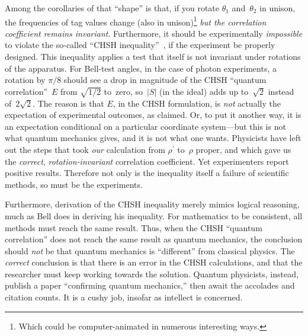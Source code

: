 \documentclass[9pt,technote]{IEEEtran}
\begin{document}
Among the corollaries of that ``shape'' is that, if you rotate
$\theta_1$ and~$\theta_2$ in unison, the frequencies of tag values
change (also in unison)\footnote{Which could be computer-animated in
  numerous interesting ways.} {\em{but the correlation coefficient
    remains invariant}}. Furthermore, it should be experimentally
{\em{impossible}} to violate the so-called ``CHSH
inequality''~\cite{enwiki:1170465048}, if the experiment be properly
designed. This inequality applies a test that itself is not invariant
under rotations of the apparatus. For Bell-test angles, in the case of
photon experiments, a rotation by $\pi\!/8$ should see a drop in
magnitude of the CHSH ``quantum correlation''~$E$ from $\sqrt{1\!/2}$
to~zero, so~$|S|$ (in the ideal) adds up to~$\sqrt2$ instead
of~$2\sqrt2$. The reason is that $E$, in the CHSH formulation, is
{\em{not}} actually the expectation of experimental outcomes, as
claimed. Or, to put it another way, it is an expectation conditional
on a particular coordinate system---but this is not what quantum
mechanics gives, and it is not what one wants. Physicists have left
out the steps that took {\em{our}} calculation from $\rho^{\prime}$
to~$\rho$ proper, and which gave us the {\em{correct}},
{\em{rotation-invariant}} correlation coefficient. Yet experimenters
report positive results. Therefore not only is the inequality itself a
failure of scientific methods, so must be the experiments.

Furthermore, derivation of the CHSH inequality merely mimics logical
reasoning, much as Bell does in deriving his inequality. For
mathematics to be consistent, all methods must reach the same
result. Thus, when the CHSH ``quantum correlation'' does not reach the
same result as quantum mechanics, the conclusion should {\em{not}} be
that quantum mechanics is ``different'' from classical physics. The
{\em{correct}} conclusion is that there is an error in the CHSH
calculations, and that the researcher must keep working towards the
solution. Quantum physicists, instead, publish a paper ``confirming
quantum mechanics,'' then await the accolades and citation counts. It
is a cushy job, insofar as intellect is concerned.
\end{document}
